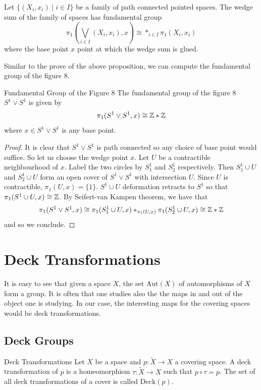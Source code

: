 \documentclass[a4paper]{article}
\begin{document}
\begin{prp}{}{} Let $\{(X_i,x_i)\;|\;i\in I\}$ be a family of path connected pointed spaces. The wedge sum of the family of spaces has fundamental group $$\pi_1\left(\bigvee_{i\in I}(X_i,x_i),x\right)\cong\ast_{i\in I}\pi_1(X_i,x_i)$$ where the base point $x$ point at which the wedge sum is glued. 
\end{prp}

Similar to the prove of the above proposition, we can compute the fundamental group of the figure 8. 

\begin{thm}{Fundamental Group of the Figure 8}{} The fundamental group of the figure 8 $S^1\vee S^1$ is given by $$\pi_1(S^1\vee S^1,x)\cong\mathbb{Z}\ast\mathbb{Z}$$ where $x\in S^1\vee S^1$ is any base point. \tcbline
\begin{proof}
It is clear that $S^1\vee S^1$ is path connected so any choice of base point would suffice. So let us choose the wedge point $x$. Let $U$ be a contractible neighbourhood of $x$. Label the two circles by $S_1^1$ and $S_2^1$ respectively. Then $S_1^1\cup U$ and $S_2^1\cup U$ form an open cover of $S^1\vee S^1$ with intersection $U$. Since $U$ is contractible, $\pi_1(U,x)=\{1\}$. $S^1\cup U$ deformation retracts to $S^1$ so that $\pi_1(S^1\cup U,x)\cong\mathbb{Z}$. By Seifert-van Kampen theorem, we have that $$\pi_1(S^1\vee S^1,x)\cong\pi_1(S_1^1\cup U,x)\ast_{\pi_1(U,x)}\pi_1(S_2^1\cup U,x)\cong\mathbb{Z}\ast\mathbb{Z}$$ and so we conclude. 
\end{proof}
\end{thm}


\pagebreak
\section{Deck Transformations}
It is easy to see that given a space $X$, the set $\text{Aut}(X)$ of automorphisms of $X$ form a group. It is often that one studies also the the maps in and out of the object one is studying. In our case, the interesting maps for the covering spaces would be deck transformations. 

\subsection{Deck Groups}
\begin{defn}{Deck Transformations}{} Let $X$ be a space and $p:\tilde{X}\to X$ a covering space. A deck transformation of $p$ is a homeomorphism $\tau:\tilde{X}\to X$ such that $p\circ\tau=p$. The set of all deck transformations of a cover is called $\text{Deck}(p)$. 
\end{defn}
\end{document}
